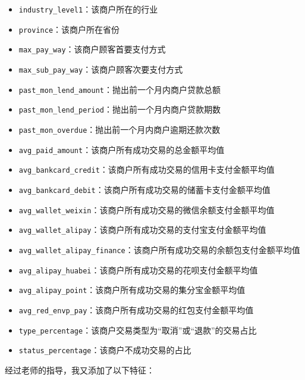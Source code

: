 \documentclass{article}
\begin{document}
\begin{itemize}
    \item \lstinline{industry_level1}：该商户所在的行业
    \item \lstinline{province}：该商户所在省份
    \item \lstinline{max_pay_way}：该商户顾客首要支付方式
    \item \lstinline{max_sub_pay_way}：该商户顾客次要支付方式
    \item \lstinline{past_mon_lend_amount}：抛出前一个月内商户贷款总额
    \item \lstinline{past_mon_lend_period}：抛出前一个月内商户贷款期数
    \item \lstinline{past_mon_overdue}：抛出前一个月内商户逾期还款次数
    \item \lstinline{avg_paid_amount}：该商户所有成功交易的总金额平均值
    \item \lstinline{avg_bankcard_credit}：该商户所有成功交易的信用卡支付金额平均值
    \item \lstinline{avg_bankcard_debit}：该商户所有成功交易的储蓄卡支付金额平均值
    \item \lstinline{avg_wallet_weixin}：该商户所有成功交易的微信余额支付金额平均值
    \item \lstinline{avg_wallet_alipay}：该商户所有成功交易的支付宝支付金额平均值
    \item \lstinline{avg_wallet_alipay_finance}：该商户所有成功交易的余额包支付金额平均值
    \item \lstinline{avg_alipay_huabei}：该商户所有成功交易的花呗支付金额平均值
    \item \lstinline{avg_alipay_point}：该商户所有成功交易的集分宝金额平均值
    \item \lstinline{avg_red_envp_pay}：该商户所有成功交易的红包支付金额平均值
    \item \lstinline{type_percentage}：该商户交易类型为“取消”或“退款”的交易占比
    \item \lstinline{status_percentage}：该商户不成功交易的占比
\end{itemize}

经过老师的指导，我又添加了以下特征：
\end{document}
